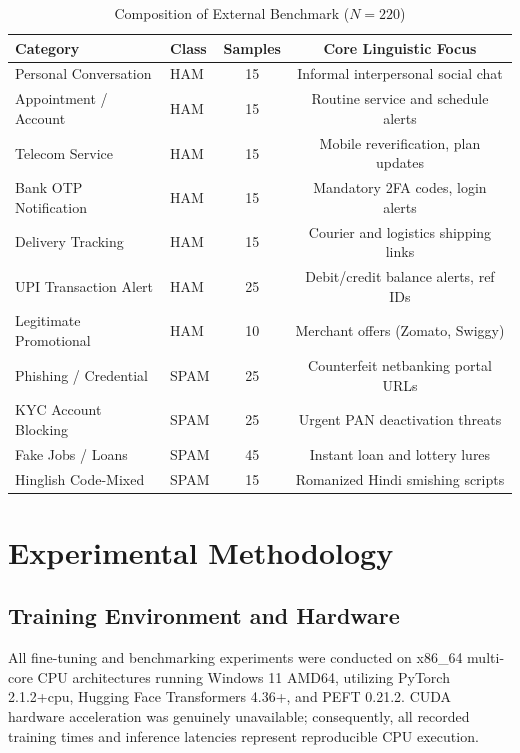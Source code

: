 \documentclass[conference]{IEEEtran}
\begin{document}
\begin{table}[t]
\caption{Composition of External Benchmark ($N=220$)}
\label{tab:benchmark_categories}
\centering
\begin{tabularx}{\columnwidth}{lXcc}
\toprule
\textbf{Category} & \textbf{Class} & \textbf{Samples} & \textbf{Core Linguistic Focus} \\
\midrule
Personal Conversation & HAM & 15 & Informal interpersonal social chat \\
Appointment / Account & HAM & 15 & Routine service and schedule alerts \\
Telecom Service & HAM & 15 & Mobile reverification, plan updates \\
Bank OTP Notification & HAM & 15 & Mandatory 2FA codes, login alerts \\
Delivery Tracking & HAM & 15 & Courier and logistics shipping links \\
UPI Transaction Alert & HAM & 25 & Debit/credit balance alerts, ref IDs \\
Legitimate Promotional & HAM & 10 & Merchant offers (Zomato, Swiggy) \\
Phishing / Credential & SPAM & 25 & Counterfeit netbanking portal URLs \\
KYC Account Blocking & SPAM & 25 & Urgent PAN deactivation threats \\
Fake Jobs / Loans & SPAM & 45 & Instant loan and lottery lures \\
Hinglish Code-Mixed & SPAM & 15 & Romanized Hindi smishing scripts \\
\bottomrule
\end{tabularx}
\end{table}

\section{Experimental Methodology}
\label{sec:methodology}

\subsection{Training Environment and Hardware}
All fine-tuning and benchmarking experiments were conducted on x86\_64 multi-core CPU architectures running Windows 11 AMD64, utilizing PyTorch 2.1.2+cpu, Hugging Face Transformers 4.36+, and PEFT 0.21.2. CUDA hardware acceleration was genuinely unavailable; consequently, all recorded training times and inference latencies represent reproducible CPU execution.
\end{document}
